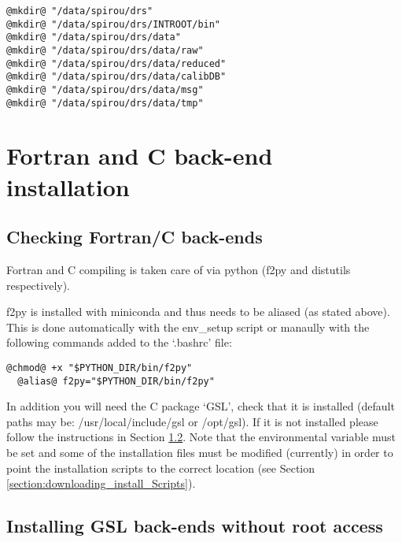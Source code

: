 \begin{lstlisting}[style=bashstyle]
@mkdir@ "/data/spirou/drs"
@mkdir@ "/data/spirou/drs/INTROOT/bin"
@mkdir@ "/data/spirou/drs/data"
@mkdir@ "/data/spirou/drs/data/raw"
@mkdir@ "/data/spirou/drs/data/reduced"
@mkdir@ "/data/spirou/drs/data/calibDB"
@mkdir@ "/data/spirou/drs/data/msg"
@mkdir@ "/data/spirou/drs/data/tmp"
\end{lstlisting}

\section{Fortran and C back-end installation}
\label{section:fortran_gsl}

\subsection{Checking Fortran/C back-ends}
\label{section:checking for Fortran/C}

Fortran and C compiling is taken care of via python (f2py and distutils respectively).

\noindent f2py is installed with miniconda and thus needs to be aliased (as stated above). This is done automatically with the env\_setup script or manaully with the following commands added to the `.bashrc' file:
\begin{lstlisting}[style=text]
  @chmod@ +x "$PYTHON_DIR/bin/f2py"
  @alias@ f2py="$PYTHON_DIR/bin/f2py"
\end{lstlisting}

In addition you will need the C package `GSL', check that it is installed (default paths may be: /usr/local/include/gsl or /opt/gsl). If it is not installed please follow the instructions in Section \ref{section:install-gsl}. Note that the  environmental variable must be set and some of the installation files must be modified (currently) in order to point the installation scripts to the correct location (see Section \ref{section:downloading_install_Scripts}).

\subsection{Installing GSL back-ends without root access}
\label{section:install-gsl}


